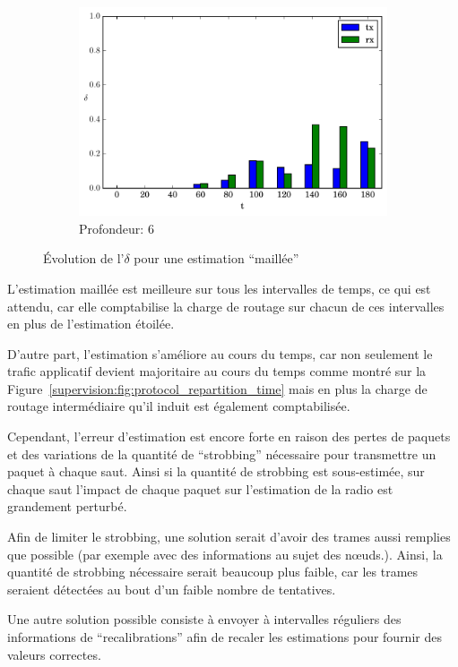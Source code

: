 \begin{figure}[h]
\begin{subfigure}{0.3\textwidth}
    \includegraphics[width=\textwidth]{img/evolution_route_6.pdf}
    \caption{Profondeur: 6}
    \label{supervision:fig:route_6}
  \end{subfigure}
  \caption{Évolution de l'$\delta$ pour une estimation ``maillée''}
  \label{supervision:fig:route}
\end{figure}

L'estimation maillée est meilleure sur tous les intervalles de temps, ce qui est attendu, car elle comptabilise la charge de routage sur chacun de ces intervalles en plus de l'estimation étoilée.

D'autre part, l'estimation s'améliore au cours du temps, car non seulement le trafic applicatif devient majoritaire au cours du temps comme montré sur la Figure~\ref{supervision:fig:protocol_repartition_time} mais en plus la charge de routage intermédiaire qu'il induit est également comptabilisée.


Cependant, l'erreur d'estimation est encore forte en raison des pertes de paquets et des variations de la quantité de ``strobbing'' nécessaire pour transmettre un paquet à chaque saut.
Ainsi si la quantité de strobbing est sous-estimée, sur chaque saut l'impact de chaque paquet sur l'estimation de la radio est grandement perturbé.

Afin de limiter le strobbing, une solution serait d'avoir des trames aussi remplies que possible (par exemple avec des informations au sujet des nœuds.).
Ainsi, la quantité de strobbing nécessaire serait beaucoup plus faible, car les trames seraient détectées au bout d'un faible nombre de tentatives.

Une autre solution possible consiste à envoyer à intervalles réguliers des informations de ``recalibrations'' afin de recaler les estimations pour fournir des valeurs correctes.

